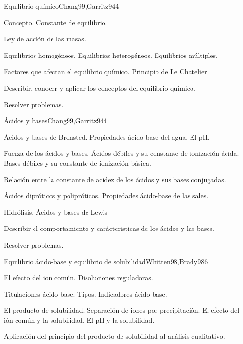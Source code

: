 \begin{syllabus}
\begin{unit}{Equilibrio químico}{Chang99,Garritz94}{4}
\begin{topics}
      \item Concepto. Constante de equilibrio.
      \item Ley de acción de las masas.
      \item Equilibrios homogéneos. Equilibrios heterogéneos. Equilibrios múltiples.
      \item Factores que afectan el equilibrio químico. Principio de Le Chatelier.
    \end{topics}
   \begin{unitgoals}
      \item Describir, conocer y aplicar los conceptos del equilibrio químico.
      \item Resolver problemas.
   \end{unitgoals}
\end{unit}

\begin{unit}{Ácidos y bases}{Chang99,Garritz94}{4}
\begin{topics}
	\item Ácidos y bases de Bronsted. Propiedades ácido-base del agua. El pH.
	\item Fuerza de los ácidos y bases. Ácidos débiles y su constante de ionización ácida. Bases débiles y su constante de ionización básica. 
	\item Relación entre la constante de acidez de los ácidos y sus bases conjugadas.
	\item Ácidos dipróticos y polipróticos. Propiedades ácido-base de las sales.
	\item Hidrólisis.  Ácidos y bases de Lewis
\end{topics}

\begin{unitgoals}
	\item Describir el comportamiento y carácteristicas de los ácidos y las bases.
	\item Resolver problemas.
\end{unitgoals}
\end{unit}

\begin{unit}{Equilibrio ácido-base y equilibrio de solubilidad}{Whitten98,Brady98}{6}
\begin{topics}
	\item El efecto del ion común. Disoluciones reguladoras.
	\item Titulaciones ácido-base. Tipos.  Indicadores ácido-base.
	\item El producto de solubilidad. Separación de iones por precipitación. El efecto del ión común y la solubilidad. El pH y la solubilidad.
	\item Aplicación del principio del producto de solubilidad al análisis cualitativo.
\end{topics}


\end{unit}
\end{syllabus}

